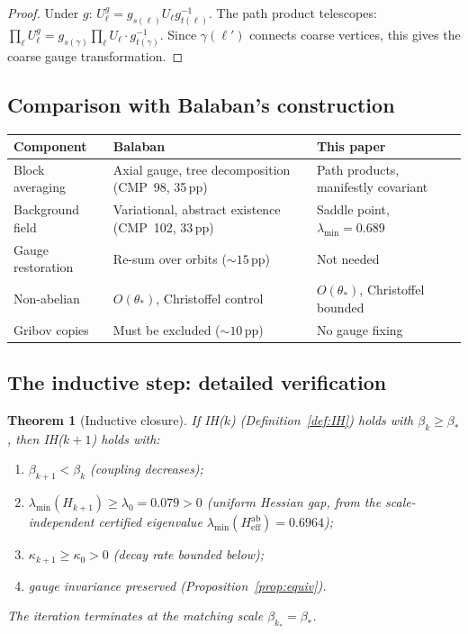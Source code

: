 \documentclass[11pt]{article}
\newtheorem{theorem}{Theorem}[section]
\theoremstyle{definition}
\begin{document}
\begin{proof}
Under $g$: $U_\ell^g=g_{s(\ell)}U_\ell g_{t(\ell)}^{-1}$.  The
path product telescopes:
$\prod_\ell U_\ell^g=g_{s(\gamma)}\prod_\ell U_\ell\cdot g_{t(\gamma)}^{-1}$.
Since $\gamma(\ell')$ connects coarse vertices, this gives the
coarse gauge transformation.
\end{proof}

\subsection{Comparison with Balaban's construction}

\begin{center}
\begin{tabular}{p{3cm}p{5cm}p{5cm}}
\toprule
\textbf{Component} & \textbf{Balaban} & \textbf{This paper}\\
\midrule
Block averaging & Axial gauge, tree
decomposition~\cite{BalabanAvg,BalabanVar} (CMP~98, 35\,pp) &
Path products, manifestly covariant\\
Background field & Variational, abstract existence (CMP~102, 33\,pp) &
Saddle point, $\lambda_{\min}=0.689$\\
Gauge restoration & Re-sum over orbits (${\sim}15$\,pp) &
Not needed\\
Non-abelian & $O(\theta_*)$, Christoffel control &
$O(\theta_*)$, Christoffel bounded\\
Gribov copies & Must be excluded (${\sim}10$\,pp) & No gauge fixing\\
\bottomrule
\end{tabular}
\end{center}

\subsection{The inductive step: detailed verification}

\begin{theorem}[Inductive closure]\label{thm:inductive}
If IH($k$) (Definition~\ref{def:IH}) holds with $\beta_k\ge\beta_*$,
then IH($k+1$) holds with:
\begin{enumerate}[nosep,label=(\roman*)]
\item $\beta_{k+1}<\beta_k$ (coupling decreases);
\item $\lambda_{\min}(H_{k+1})\ge\lambda_0=0.079>0$ (uniform
Hessian gap, from the scale-independent certified eigenvalue
$\lambda_{\min}(H_{\mathrm{eff}}^{\mathrm{ab}})=0.6964$);
\item $\kappa_{k+1}\ge\kappa_0>0$ (decay rate bounded below);
\item gauge invariance preserved (Proposition~\ref{prop:equiv}).
\end{enumerate}
The iteration terminates at the matching scale
$\beta_{k_*}=\beta_*$.
\end{theorem}
\end{document}
